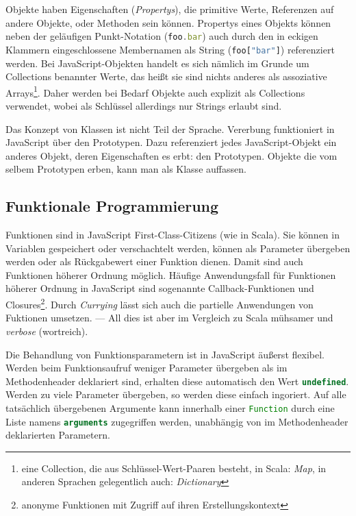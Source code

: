 \documentclass[a4paper, 12pt, hidelinks, listof=totoc, listoftables=totoc, bibliography=totoc]{scrreprt}
\newcommand{\js}[1]{\lstinline[language=JavaScript, style=inline]|#1|}
\begin{document}
Objekte haben Eigenschaften (\emph{Propertys}), die primitive Werte, Referenzen auf andere Objekte, oder Methoden sein können. Propertys eines Objekts können neben der geläufigen Punkt-Notation (\js{foo.bar}) auch durch den in eckigen Klammern eingeschlossene Membernamen als String \mbox{(\js{foo["bar"]})} referenziert werden. Bei JavaScript-Objekten handelt es sich nämlich im Grunde um Collections benannter Werte, das heißt sie sind nichts anderes als assoziative Arrays\footnote{eine Collection, die aus Schlüssel-Wert-Paaren besteht, in Scala: \emph{Map}, in anderen Sprachen gelegentlich auch: \emph{Dictionary}}. Daher werden bei Bedarf Objekte auch explizit als Collections verwendet, wobei als Schlüssel allerdings nur Strings erlaubt sind.

Das Konzept von Klassen ist nicht Teil der Sprache. Vererbung funktioniert in JavaScript über den Prototypen. Dazu referenziert jedes JavaScript-Objekt ein anderes Objekt, deren Eigenschaften es erbt: den Prototypen. Objekte die vom selbem Prototypen erben, kann man als Klasse auffassen. \cite{mdn.WWO}\cite[S. 115 ff., S. 199 ff.]{flanagan2011.JDG}

\subsection{Funktionale Programmierung}

Funktionen sind in JavaScript First-Class-Citizens (wie in Scala). Sie können in Variablen gespeichert oder verschachtelt werden, können als Parameter übergeben werden oder als Rückgabewert einer Funktion dienen. Damit sind auch Funktionen höherer Ordnung möglich. Häufige Anwendungsfall für Funktionen höherer Ordnung in JavaScript sind sogenannte Callback-Funktionen und Closures\footnote{anonyme Funktionen mit Zugriff auf ihren Erstellungskontext}. Durch \emph{Currying} lässt sich auch die partielle Anwendungen von Fuktionen umsetzen. --- All dies ist aber im Vergleich zu Scala mühsamer und \emph{verbose} (wortreich).

Die Behandlung von Funktionsparametern ist in JavaScript äußerst flexibel. Werden beim Funktionsaufruf weniger Parameter übergeben als im Methodenheader deklariert sind, erhalten diese automatisch den Wert \js{undefined}. Werden zu viele Parameter übergeben, so werden diese einfach ingoriert. Auf alle tatsächlich übergebenen Argumente kann innerhalb einer \js{Function} durch eine Liste namens \js{arguments} zugegriffen werden, unabhängig von im Methodenheader deklarierten Parametern.
\end{document}
